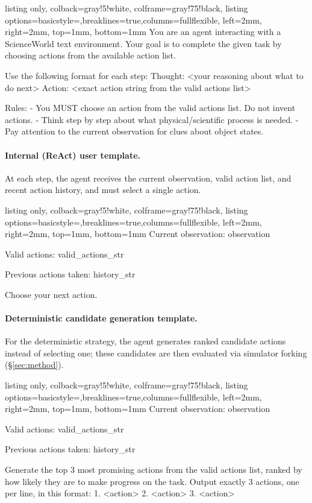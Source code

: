 \documentclass[11pt]{article}
\begin{document}
\begin{tcblisting}{listing only, colback=gray!5!white, colframe=gray!75!black,
  listing options={basicstyle=\small\ttfamily,breaklines=true,columns=fullflexible},
  left=2mm, right=2mm, top=1mm, bottom=1mm}
You are an agent interacting with a ScienceWorld text
environment. Your goal is to complete the given task by
choosing actions from the available action list.

Use the following format for each step:
Thought: <your reasoning about what to do next>
Action: <exact action string from the valid actions list>

Rules:
- You MUST choose an action from the valid actions list.
  Do not invent actions.
- Think step by step about what physical/scientific
  process is needed.
- Pay attention to the current observation for clues
  about object states.
\end{tcblisting}

\paragraph{Internal (ReAct) user template.} At each step, the agent receives the current observation, valid action list, and recent action history, and must select a single action.

\begin{tcblisting}{listing only, colback=gray!5!white, colframe=gray!75!black,
  listing options={basicstyle=\small\ttfamily,breaklines=true,columns=fullflexible},
  left=2mm, right=2mm, top=1mm, bottom=1mm}
Current observation:
{observation}

Valid actions:
{valid_actions_str}

Previous actions taken: {history_str}

Choose your next action.
\end{tcblisting}

\paragraph{Deterministic candidate generation template.} For the deterministic strategy, the agent generates ranked candidate actions instead of selecting one; these candidates are then evaluated via simulator forking (\S\ref{sec:method}).

\begin{tcblisting}{listing only, colback=gray!5!white, colframe=gray!75!black,
  listing options={basicstyle=\small\ttfamily,breaklines=true,columns=fullflexible},
  left=2mm, right=2mm, top=1mm, bottom=1mm}
Current observation:
{observation}

Valid actions:
{valid_actions_str}

Previous actions taken: {history_str}

Generate the top 3 most promising actions from the valid
actions list, ranked by how likely they are to make
progress on the task. Output exactly 3 actions, one per
line, in this format:
1. <action>
2. <action>
3. <action>
\end{tcblisting}
\end{document}
